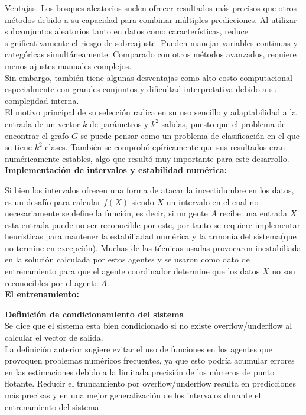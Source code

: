     Ventajas: Los bosques aleatorios suelen ofrecer resultados más precisos que otros métodos debido a su capacidad para combinar múltiples predicciones. Al utilizar 
    subconjuntos aleatorios tanto en datos como características, reduce significativamente el riesgo de sobreajuste. Pueden manejar variables continuas y categóricas 
    simultáneamente. Comparado con otros métodos avanzados, requiere menos ajustes manuales complejos. \\
    
    Sin embargo, también tiene algunas desventajas como alto costo computacional especialmente con grandes conjuntos y dificultad interpretativa debido a su 
    complejidad interna. \\

    El motivo principal de su selección radica en su uso sencillo y adaptabilidad a la entrada de un vector $k$ de parámetros y $k^2$ salidas, puesto que el problema 
    de encontrar el grafo $G$ se puede pensar como un problema de clasificación en el que se tiene $k^2$ clases. También se comprobó epíricamente que sus resultados
    eran numéricamente estables, algo que resultó muy importante para este desarrollo. \\


    \textbf{Implementación de intervalos y estabilidad numérica:}

    Si bien los intervalos ofrecen una forma de atacar la incertidumbre en los datos, es un desafío para calcular $f(X)$ siendo $X$ un intervalo en el cual no 
    necesariamente se define la función, es decir, si un gente $A$ recibe una entrada $X$ esta entrada puede no ser reconocible por este, por tanto se requiere 
    implementar heurísticas para mantener la estabiliadad numérica y la armonía del sistema(que no termine en excepción). Muchas de las técnicas usadas provocaron 
    inestabiliada en la solución calculada por estos agentes y se usaron como dato de entrenamiento para que el agente coordinador determine que los datos $X$ no 
    son reconocibles por el agente $A$. \\

    \textbf{El entrenamiento:}

    \textbf{ Definición de condicionamiento del sistema} \\
    Se dice que el sistema esta bien condicionado si no existe overflow/underflow al calcular el vector de salida. \\


    La definición anterior sugiere evitar el uso de funciones en los agentes que provoquen problemas numéricos frecuentes, ya que esto podría acumular errores en las estimaciones 
    debido a la limitada precisión de los números de punto flotante. Reducir el truncamiento por overflow/underflow resulta en predicciones más precisas y en una mejor 
    generalización de los intervalos durante el entrenamiento del sistema.


